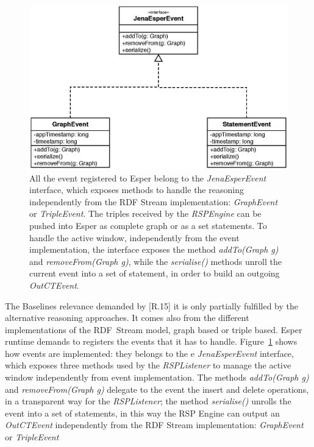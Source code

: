 \begin{figure}[p!]
  \centering
	\includegraphics[width=0.8\linewidth]{images/uml_baselines_events}
	\caption[Esper-level Graph based and Triple based - UML Schema]{ All the event registered to Esper belong to the \textit{JenaEsperEvent} interface, which exposes methods to handle the reasoning independently from the RDF Stream implementation:  \textit{GraphEvent} or \textit{TripleEvent}. The triples received by the \textit{RSPEngine} can be pushed into Esper as complete graph or as a set statements. To handle the active window, independently from the event implementation, the interface exposes the method \textit{addTo(Graph g)} and \textit{removeFrom(Graph g)}, while the \textit{serialise()} methods unroll the current event into a set of statement, in order to build an outgoing \textit{OutCTEvent}.}
  	\label{fig:uml_baselines_events}
\end{figure}

The Baselines relevance demanded by [R.15] it is only partially fulfilled by the alternative reasoning approaches. It comes also from the different implementations of the RDF~Stream model, graph based or triple based. Esper runtime demands to registers the events that it has to handle. Figure~\ref{fig:uml_baselines_events} shows how events are implemented: they belongs to the e \textit{JenaEsperEvent} interface, which exposes three methods used by the \textit{RSPListener} to manage the active window independently from event implementation. The methods \textit{addTo(Graph g)} and \textit{removeFrom(Graph g)} delegate to the event the insert and delete operations, in a transparent way for the \textit{RSPListener}; the method \textit{serialise()} unrolls the event into a set of statements, in this way the RSP Engine can output an \textit{OutCTEvent} independently from the RDF Stream implementation: \textit{GraphEvent} or \textit{TripleEvent}

